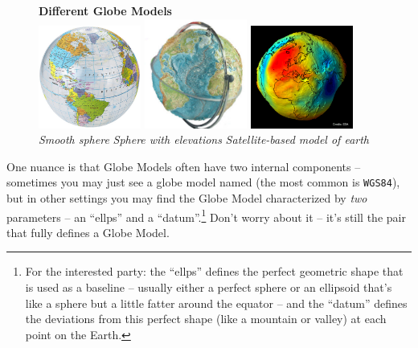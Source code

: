 \documentclass[11pt]{article}
\begin{document}
\begin{figure}[h!]
	\begin{center}
		\textbf{Different Globe Models}\\
		\includegraphics[width = 0.3\textwidth]{media/globe_perfectsphere.jpg} \hspace{0.5cm}
		\includegraphics[width = 0.3\textwidth]{media/globe_elevations2.jpg}  \hspace{0.5cm}
		\includegraphics[width = 0.3\textwidth]{media/globe_fullgeoid.png}  \\
		\emph{Smooth sphere} \hspace{2.3cm} \emph{Sphere with elevations} \hspace{2cm} \emph{Satellite-based model of earth}\footnotemark{}
	\end{center}
\end{figure}

One nuance is that Globe Models often have two internal components -- sometimes you may just see a globe model named (the most common is \texttt{WGS84}), but in other settings you may find the Globe Model characterized by \emph{two} parameters -- an ``ellps'' and a ``datum''.\footnote{For the interested party: the ``ellps'' defines the perfect geometric shape that is used as a baseline -- usually either a perfect sphere or an ellipsoid that's like a sphere but a little fatter around the equator -- and the ``datum'' defines the deviations from this perfect shape (like a mountain or valley) at each point on the Earth.} Don't worry about it -- it's still the pair that fully defines a Globe Model.
\end{document}
